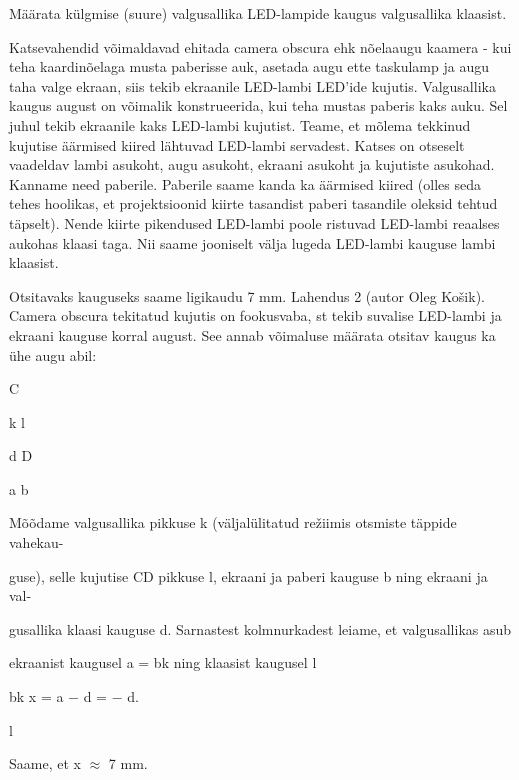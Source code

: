 
Määrata külgmise (suure) valgusallika LED-lampide kaugus valgusallika klaasist.

\hint

\solu
Katsevahendid võimaldavad ehitada camera obscura ehk nõelaaugu kaamera - kui teha kaardinõelaga musta paberisse auk, asetada augu ette taskulamp ja augu taha valge ekraan, siis tekib ekraanile LED-lambi LED'ide kujutis. Valgusallika kaugus august on võimalik konstrueerida, kui teha mustas paberis kaks auku. Sel juhul tekib ekraanile kaks LED-lambi kujutist. Teame, et mõlema tekkinud kujutise äärmised kiired lähtuvad LED-lambi servadest. Katses on otseselt vaadeldav lambi asukoht, augu asukoht, ekraani asukoht ja kujutiste asukohad. Kanname need paberile. Paberile saame kanda ka äärmised kiired (olles seda tehes hoolikas, et projektsioonid kiirte tasandist paberi tasandile oleksid tehtud täpselt). Nende kiirte pikendused LED-lambi poole ristuvad LED-lambi reaalses aukohas klaasi taga. Nii saame jooniselt välja lugeda LED-lambi kauguse lambi klaasist.

Otsitavaks kauguseks saame ligikaudu 7 mm. Lahendus 2 (autor Oleg Košik). Camera obscura tekitatud kujutis on fookusvaba, st tekib suvalise LED-lambi ja ekraani kauguse korral august. See annab võimaluse määrata otsitav kaugus ka ühe augu abil:

C

k l

d D

a b

Mõõdame valgusallika pikkuse k (väljalülitatud režiimis otsmiste täppide vahekau-

guse), selle kujutise CD pikkuse l, ekraani ja paberi kauguse b ning ekraani ja val-

gusallika klaasi kauguse d. Sarnastest kolmnurkadest leiame, et valgusallikas asub

ekraanist kaugusel a = bk ning klaasist kaugusel l

bk x = a $-$ d = $-$ d.

l

Saame, et x $\approx$ 7 mm.
\probend
